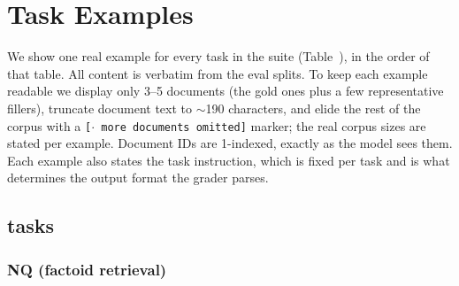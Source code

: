 \section{Task Examples}
\label{app:examples}


We show one real example for every task in the suite (Table~\claude{\ref{tab:eval-datasets}}), in the order of that
table. All content is verbatim from the eval splits. To keep each example readable we display only
3--5 documents (the gold ones plus a few representative fillers), truncate document text to
$\sim$190 characters, and elide the rest of the corpus with a
\texttt{[$\cdot$ more documents omitted]} marker; the real corpus sizes are stated per example.
Document IDs are 1-indexed, exactly as the model sees them. Each example also states the task
instruction, which is fixed per task and is what determines the output format the grader parses.

\subsection{\texorpdfstring{}{OT(N)} tasks}

\subsubsection{NQ (factoid retrieval)}

